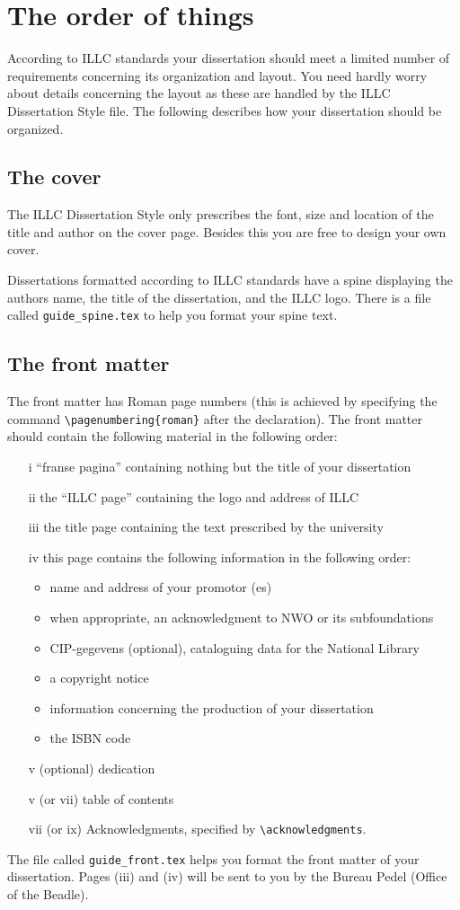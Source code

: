 \chapter{The order of things}
According to ILLC standards your dissertation should meet a limited number
of requirements concerning its organization and layout. You need hardly 
worry about details concerning the layout as these are handled by the
ILLC Dissertation Style file. The following describes how your dissertation
should be organized.

\section{The cover}
The ILLC Dissertation Style only prescribes the font, size and location 
of the title and author on the cover page. Besides this you are free to 
design your own cover.

Dissertations formatted according to ILLC standards have a spine displaying
the authors name, the title of the dissertation, and the ILLC logo.
There is a file called {\tt guide\_spine.tex} to help you format 
your spine text.


\section{The front matter}
The front matter has Roman page numbers (this is achieved by
specifying the command \verb|\pagenumbering{roman}| after the 
\verb|| declaration). The front matter should contain 
the following material in the following order:
\begin{enumerate}
\item[i]
``franse pagina'' containing nothing but the title of your dissertation
\item[ii]
the ``ILLC page'' containing the logo and address of ILLC
\item[iii]
the title page containing the text prescribed by the university
\item[iv]
this page contains the following information in the following order:
	\begin{itemize}
	\item
	name and address of your promotor (es)
	\item
	when appropriate, an acknowledgment to NWO or its subfoundations
	\item
	CIP-gegevens (optional), cataloguing data for the National Library
	\item
	a copyright notice
	\item
	information concerning the production of your dissertation
	\item
	the ISBN code
	\end{itemize}
\item[v] (optional)
dedication
\item[v] (or vii)
table of contents
\item[vii] (or ix)
Acknowledgments, specified by \verb|\acknowledgments|.
\end{enumerate}
The file called  \verb|guide_front.tex| helps you format
the front matter of your dissertation.
Pages (iii) and (iv) will be sent to you by the Bureau Pedel (Office of the Beadle).



